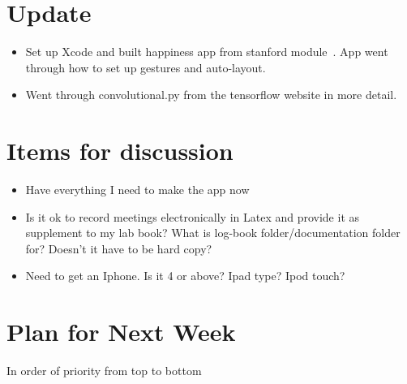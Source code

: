 \documentclass[]{weekly-report}
\begin{document}

\def\studentname{Philip Corr}
\def\projecttitle{ConvNets for iOS Gesture Recognition Applications}
\def\ucdstudentnumber{12318581}
\def\weeklyreportnumber{6}
\maketitle


\section{Update}

\begin{itemize}

\item Set up Xcode and built happiness app from stanford module~\cite{PaulHegarty2016}. App went through how to set up gestures and auto-layout.

\item Went through convolutional.py from the tensorflow website in more detail. 
	
\end{itemize}

\section{Items for discussion}

\begin{itemize}

\item Have everything I need to make the app now

\item Is it ok to record meetings electronically in Latex and provide it as supplement to my lab book? What is log-book folder/documentation folder for? Doesn't it have to be hard copy?

\item Need to get an Iphone. Is it 4 or above? Ipad type? Ipod touch?

\end{itemize}

\section{Plan for Next Week}
In order of priority from top to bottom
\end{document}
